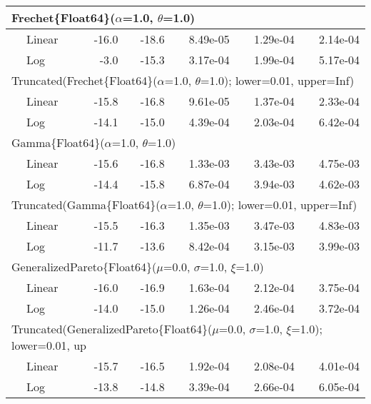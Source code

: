 \begin{tabular}{|llrrrrr|}
\hline
\multicolumn{7}{|l|}{Frechet\{Float64\}($\alpha$=1.0, $\theta$=1.0)}\\ \hline
& Linear & {\color{blue}-16.0} & {\color{blue}-18.6} & {\color{blue}8.49e-05} & {\color{blue}1.29e-04} & {\color{blue}2.14e-04}\\
& Log & -3.0 & -15.3 & 3.17e-04 & 1.99e-04 & 5.17e-04\\
\hline
\multicolumn{7}{|l|}{Truncated(Frechet\{Float64\}($\alpha$=1.0, $\theta$=1.0); lower=0.01, upper=Inf)}\\ \hline
& Linear & {\color{blue}-15.8} & {\color{blue}-16.8} & {\color{blue}9.61e-05} & {\color{blue}1.37e-04} & {\color{blue}2.33e-04}\\
& Log & -14.1 & -15.0 & 4.39e-04 & 2.03e-04 & 6.42e-04\\
\hline
\multicolumn{7}{|l|}{Gamma\{Float64\}($\alpha$=1.0, $\theta$=1.0)}\\ \hline
& Linear & {\color{blue}-15.6} & {\color{blue}-16.8} & 1.33e-03 & {\color{blue}3.43e-03} & 4.75e-03\\
& Log & -14.4 & -15.8 & {\color{blue}6.87e-04} & 3.94e-03 & {\color{blue}4.62e-03}\\
\hline
\multicolumn{7}{|l|}{Truncated(Gamma\{Float64\}($\alpha$=1.0, $\theta$=1.0); lower=0.01, upper=Inf)}\\ \hline
& Linear & {\color{blue}-15.5} & {\color{blue}-16.3} & 1.35e-03 & 3.47e-03 & 4.83e-03\\
& Log & -11.7 & -13.6 & {\color{blue}8.42e-04} & {\color{blue}3.15e-03} & {\color{blue}3.99e-03}\\
\hline
\multicolumn{7}{|l|}{GeneralizedPareto\{Float64\}($\mu$=0.0, $\sigma$=1.0, $\xi$=1.0)}\\ \hline
& Linear & {\color{blue}-16.0} & {\color{blue}-16.9} & 1.63e-04 & {\color{blue}2.12e-04} & 3.75e-04\\
& Log & -14.0 & -15.0 & {\color{blue}1.26e-04} & 2.46e-04 & {\color{blue}3.72e-04}\\
\hline
\multicolumn{7}{|l|}{Truncated(GeneralizedPareto\{Float64\}($\mu$=0.0, $\sigma$=1.0, $\xi$=1.0); lower=0.01, up}\\ \hline
& Linear & {\color{blue}-15.7} & {\color{blue}-16.5} & {\color{blue}1.92e-04} & {\color{blue}2.08e-04} & {\color{blue}4.01e-04}\\
& Log & -13.8 & -14.8 & 3.39e-04 & 2.66e-04 & 6.05e-04\\
\hline
\end{tabular}